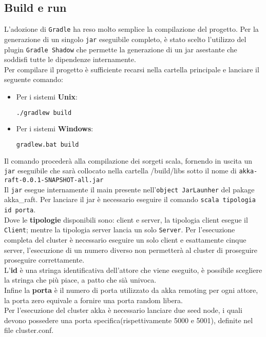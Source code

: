  	\subsection{Build e run}
	 	L'adozione di \texttt{Gradle} ha reso molto semplice la compilazione del progetto.
	 	Per la generazione di un singolo \texttt{jar} eseguibile completo, è stato scelto l'utilizzo del plugin \texttt{Gradle Shadow}\cite{GradleShadowSite} che permette la generazione di un jar asestante che soddisfi tutte le dipendenze internamente.\\
	 	Per compilare il progetto è sufficiente recarsi nella cartella principale e lanciare il seguente comando:
	 	\begin{itemize}
	 		\item Per i sistemi \textbf{Unix}: 
	 			\begin{lstlisting}[language=bash]
	 				./gradlew build
	 			\end{lstlisting}
	 		\item Per i sistemi \textbf{Windows}: 
	 			\begin{lstlisting}[language=bash]
	 				gradlew.bat build
	 			\end{lstlisting} 
	 	\end{itemize}
		Il comando procederà alla compilazione dei sorgeti scala, fornendo in uscita un \texttt{jar} eseguibile che sarà collocato nella cartella /build/libs sotto il nome di \texttt{akka-raft-0.0.1-SNAPSHOT-all.jar}\\
		Il \texttt{jar} esegue internamente il main presente nell'\texttt{object JarLaunher} del pakage akka\_raft.
	  Per lanciare il jar è necessario eseguire il comando \texttt{scala tipologia id porta}.\\
		Dove le \textbf{tipologie} disponibili sono: client e server, la tipologia client esegue il \texttt{Client};
		mentre la tipologia server lancia un solo \texttt{Server}.
		Per l'esecuzione completa del cluster è necessario eseguire un solo client e esattamente cinque server, l'esecuzione di un numero diverso non permetterà al cluster di proseguire proseguire correttamente.\\
		L'\textbf{id} è una stringa identificativa dell'attore che viene eseguito, è possibile scegliere la stringa che più piace, a patto che sià univoca.\\
		Infine la \textbf{porta} è il numero di porta utilizzato da akka remoting per ogni attore, la porta zero equivale a fornire una porta random libera.\\
		Per l'esecuzione del cluster akka è necessario lanciare due seed node, i quali devono possedere una porta specifica(rispettivamente 5000 e 5001), definite nel file cluster.conf.\\
